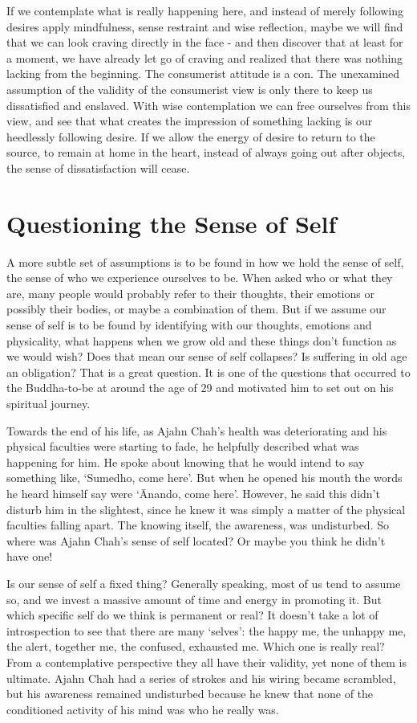 If we contemplate what is really happening here, and instead of merely
following desires apply mindfulness, sense restraint and wise
reflection, maybe we will find that we can look craving directly in the
face - and then discover that at least for a moment, we have already let
go of craving and realized that there was nothing lacking from the
beginning. The consumerist attitude is a con. The unexamined assumption
of the validity of the consumerist view is only there to keep us
dissatisfied and enslaved. With wise contemplation we can free ourselves
from this view, and see that what creates the impression of something
lacking is our heedlessly following desire. If we allow the energy of
desire to return to the source, to remain at home in the heart, instead
of always going out after objects, the sense of dissatisfaction will
cease.

\section{Questioning the Sense of Self}

A more subtle set of assumptions is to be found in how we hold the
sense of self, the sense of who we experience ourselves to be. When
asked who or what they are, many people would probably refer to their
thoughts, their emotions or possibly their bodies, or maybe a
combination of them. But if we assume our sense of self is to be found
by identifying with our thoughts, emotions and physicality, what happens
when we grow old and these things don’t function as we would wish? Does
that mean our sense of self collapses? Is suffering in old age an
obligation? That is a great question. It is one of the questions that
occurred to the Buddha-to-be at around the age of 29 and motivated him
to set out on his spiritual journey.

Towards the end of his life, as Ajahn Chah’s health was deteriorating
and his physical faculties were starting to fade, he helpfully described
what was happening for him. He spoke about knowing that he would intend
to say something like, ‘Sumedho, come here’. But when he opened his
mouth the words he heard himself say were ‘Ānando, come here’. However,
he said this didn’t disturb him in the slightest, since he knew it was
simply a matter of the physical faculties falling apart. The knowing
itself, the awareness, was undisturbed. So where was Ajahn Chah’s sense
of self located? Or maybe you think he didn’t have one!

Is our sense of self a fixed thing? Generally speaking, most of us tend
to assume so, and we invest a massive amount of time and energy in
promoting it. But which specific self do we think is permanent or real?
It doesn’t take a lot of introspection to see that there are many
‘selves’: the happy me, the unhappy me, the alert, together me, the
confused, exhausted me. Which one is really real? From a contemplative
perspective they all have their validity, yet none of them is ultimate.
Ajahn Chah had a series of strokes and his wiring became scrambled, but
his awareness remained undisturbed because he knew that none of the
conditioned activity of his mind was who he really was.

